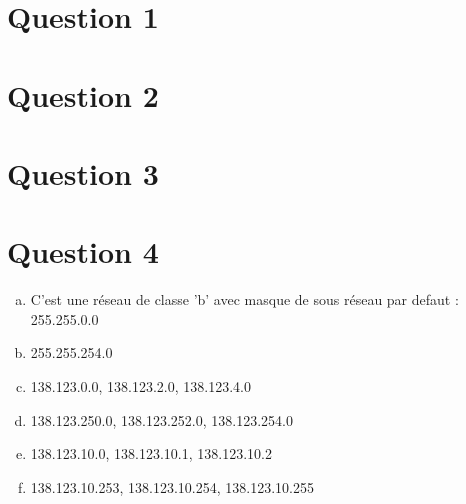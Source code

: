 
\section{Question 1}


\section{Question 2}


\section{Question 3}


\section{Question 4}

\begin{enumerate}[(a)]
	\item C'est une réseau de classe 'b' avec masque de sous réseau 
		par defaut : 255.255.0.0
	\item 255.255.254.0
	\item 138.123.0.0, 138.123.2.0, 138.123.4.0
	\item 138.123.250.0, 138.123.252.0, 138.123.254.0
	\item 138.123.10.0, 138.123.10.1, 138.123.10.2
	\item 138.123.10.253, 138.123.10.254, 138.123.10.255
\end{enumerate}

